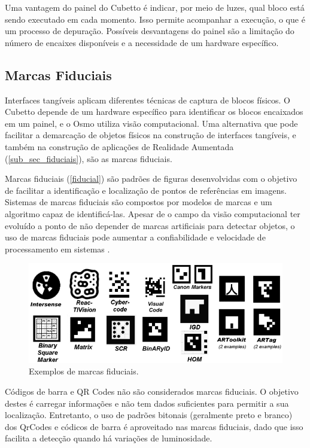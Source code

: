 Uma vantagem do painel do Cubetto é indicar, por meio de luzes, qual bloco está sendo executado em cada momento. Isso permite acompanhar a execução, o que é um processo de depuração. Possíveis desvantagens do painel são a limitação do número de encaixes disponíveis e a necessidade de um hardware específico.

\subsection{Marcas Fiduciais}
\label{sub_sec_fiduciais}
Interfaces tangíveis aplicam diferentes técnicas de captura de blocos físicos. O Cubetto depende de um hardware específico para identificar os blocos encaixados em um painel, e o Osmo utiliza visão computacional. Uma alternativa que pode facilitar a demarcação de objetos físicos na construção de interfaces tangíveis, e também na construção de aplicações de Realidade Aumentada (\autoref{sub_sec_fiduciais}), são as marcas fiduciais. 

Marcas fiduciais (\autoref{fiducial}) são padrões de figuras desenvolvidas com o objetivo de facilitar a identificação e localização de pontos de referências em imagens. Sistemas de marcas fiduciais são compostos por modelos de marcas e um algoritmo capaz de identificá-las. Apesar de o campo da visão computacional ter evoluído a ponto de não depender de marcas artificiais para detectar objetos, o uso de marcas fiduciais pode aumentar a confiabilidade e velocidade de processamento em sistemas \cite{fiala_designing_2010}.

\begin{figure}[!htbp]
    \centering
    \includegraphics[width=0.9\linewidth,fbox]{figs/fiducial_marks.png}
    \caption{Exemplos de marcas fiduciais.}
    \label{fiducial}
\end{figure}

Códigos de barra e QR Codes não são considerados marcas fiduciais. O objetivo destes é carregar informações e não tem dados suficientes para permitir a sua localização. Entretanto, o uso de padrões bitonais (geralmente preto e branco) dos QrCodes e códicos de barra é aproveitado nas marcas fiduciais, dado que isso facilita a detecção quando há variações de luminosidade.

